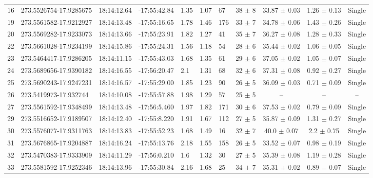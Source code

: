 \begin{table}[htbp!]
\begin{tabular}{llllllllccc}
16  &  273.5526754-17.9285675  &  18:14:12.64  &  -17:55:42.84  &  1.35  &  1.07  &  67  &  38 $\pm$ 8  &  33.87 $\pm$ 0.03  &  1.26 $\pm$ 0.13  &  Single \\
19  &  273.5561582-17.9212927  &  18:14:13.48  &  -17:55:16.65  &  1.78  &  1.46  &  176  &  33 $\pm$ 7  &  34.78 $\pm$ 0.06  &  1.43 $\pm$ 0.26  &  Single \\
20  &  273.5569282-17.9233073  &  18:14:13.66  &  -17:55:23.91  &  1.82  &  1.27  &  41  &  35 $\pm$ 7  &  36.27 $\pm$ 0.08  &  1.28 $\pm$ 0.33  &  Single \\
22  &  273.5661028-17.9234199  &  18:14:15.86  &  -17:55:24.31  &  1.56  &  1.18  &  54  &  28 $\pm$ 6  &  35.44 $\pm$ 0.02  &  1.06 $\pm$ 0.05  &  Single \\
23  &  273.5464417-17.9286205  &  18:14:11.15  &  -17:55:43.03  &  1.68  &  1.35  &  61  &  29 $\pm$ 6  &  37.05 $\pm$ 0.02  &  1.05 $\pm$ 0.07  &  Single \\
24  &  273.5689656-17.9390182  &  18:14:16.55  &  -17:56:20.47  &  2.1  &  1.31  &  68  &  32 $\pm$ 6  &  37.31 $\pm$ 0.08  &  0.92 $\pm$ 0.27  &  Single \\
25  &  273.5690243-17.9247231  &  18:14:16.57  &  -17:55:29.00  &  1.85  &  1.23  &  90  &  26 $\pm$ 5  &  36.09 $\pm$ 0.03  &  0.71 $\pm$ 0.09  &  Single \\
26  &  273.5419973-17.932744  &  18:14:10.08  &  -17:55:57.88  &  1.98  &  1.29  &  57  &  25 $\pm$ 5  &  --  &  --  &  -- \\
27  &  273.5561592-17.9348499  &  18:14:13.48  &  -17:56:5.460  &  1.97  &  1.82  &  171  &  30 $\pm$ 6  &  37.53 $\pm$ 0.02  &  0.79 $\pm$ 0.09  &  Single \\
29  &  273.5516652-17.9189507  &  18:14:12.40  &  -17:55:8.220  &  1.91  &  1.67  &  112  &  27 $\pm$ 5  &  35.87 $\pm$ 0.09  &  1.31 $\pm$ 0.27  &  Single \\
30  &  273.5576077-17.9311763  &  18:14:13.83  &  -17:55:52.23  &  1.68  &  1.49  &  16  &  32 $\pm$ 7  &  40.0 $\pm$ 0.07  &  2.2 $\pm$ 0.75  &  Single \\
31  &  273.5676865-17.9204887  &  18:14:16.24  &  -17:55:13.76  &  2.18  &  1.55  &  158  &  26 $\pm$ 5  &  33.52 $\pm$ 0.07  &  0.98 $\pm$ 0.19  &  Single \\
32  &  273.5470383-17.9333909  &  18:14:11.29  &  -17:56:0.210  &  1.6  &  1.32  &  30  &  27 $\pm$ 5  &  35.39 $\pm$ 0.08  &  1.19 $\pm$ 0.28  &  Single \\
33  &  273.5581592-17.9252346  &  18:14:13.96  &  -17:55:30.84  &  2.16  &  1.68  &  25  &  34 $\pm$ 7  &  35.31 $\pm$ 0.02  &  0.89 $\pm$ 0.07  &  Single \\

\end{tabular}
\end{table}
